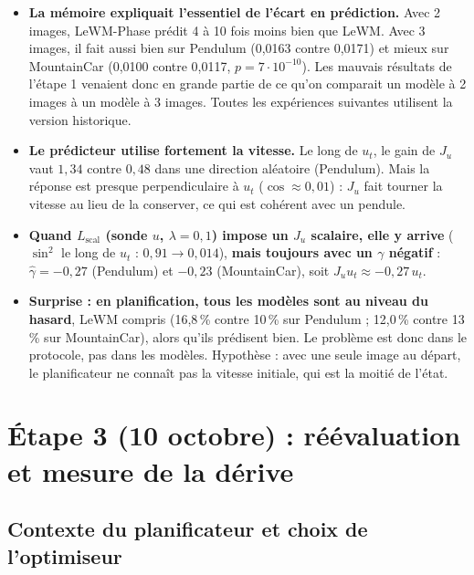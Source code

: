 \documentclass[11pt,a4paper]{article}
\newcommand{\Lscal}{L_{\mathrm{scal}}}
\begin{document}
\begin{itemize}
  \item \textbf{La mémoire expliquait l'essentiel de l'écart en prédiction.} Avec 2 images,
  LeWM-Phase prédit 4 à 10 fois moins bien que LeWM. Avec 3 images, il fait aussi bien sur
  Pendulum (0,0163 contre 0,0171) et mieux sur MountainCar (0,0100 contre 0,0117,
  $p = 7\cdot 10^{-10}$). Les mauvais résultats de l'étape 1 venaient donc en grande partie de
  ce qu'on comparait un modèle à 2 images à un modèle à 3 images. Toutes les expériences
  suivantes utilisent la version historique.
  \item \textbf{Le prédicteur utilise fortement la vitesse.} Le long de $u_t$, le gain de $J_u$ vaut $1{,}34$ contre $0{,}48$ dans une
  direction aléatoire (Pendulum). Mais la réponse est presque perpendiculaire à $u_t$
  ($\cos \approx 0{,}01$) : $J_u$ fait tourner la vitesse au lieu de la conserver, ce qui est
  cohérent avec un pendule.
  \item \textbf{Quand $\Lscal$ (sonde $u$, $\lambda = 0{,}1$) impose un $J_u$ scalaire, elle y
  arrive} ($\sin^2$ le long de $u_t$ : $0{,}91 \to 0{,}014$), \textbf{mais toujours avec un
  $\gamma$ négatif} : $\hat\gamma = -0{,}27$ (Pendulum) et $-0{,}23$ (MountainCar), soit
  $J_u u_t \approx -0{,}27\, u_t$.
  \item \textbf{Surprise : en planification, tous les modèles sont au niveau du hasard}, LeWM
  compris (16,8\,\% contre 10\,\% sur Pendulum ; 12,0\,\% contre 13\,\% sur MountainCar),
  alors qu'ils prédisent bien. Le problème est donc dans le protocole, pas dans les modèles.
  Hypothèse : avec une seule image au départ, le planificateur ne connaît pas la vitesse
  initiale, qui est la moitié de l'état.
\end{itemize}

\section{Étape 3 (10 octobre) : réévaluation et mesure de la dérive}
\label{sec:ev2}

\subsection{Contexte du planificateur et choix de l'optimiseur}
\end{document}
